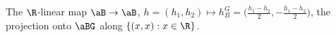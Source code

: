 The $\R$-linear map $\aB\to\aB$, $h=(h_1,h_2)\mapsto h_B^G=\bigl(\tfrac{h_1-h_2}2,-\tfrac{h_1-h_2}2\bigr)$, the projection onto $\aBG$ along $\{(x,x):x\in\R\}$.
